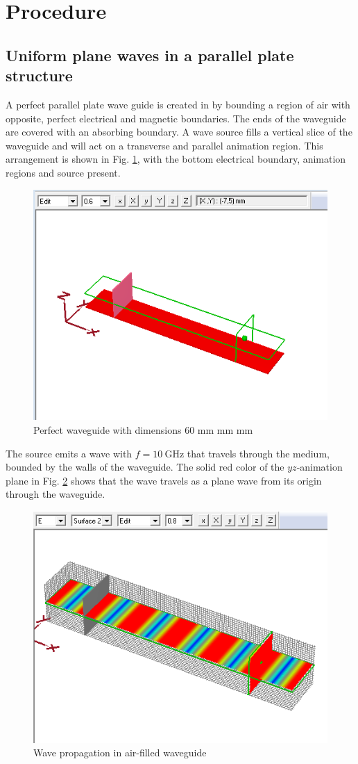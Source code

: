 \section{Procedure}\label{sec:procedure}
\subsection{Uniform plane waves in a parallel plate structure}
A perfect parallel plate wave guide is created in \mefisto by bounding a region of air with opposite, perfect electrical and magnetic boundaries.
The ends of the waveguide are covered with an absorbing boundary.
A wave source fills a vertical slice of the waveguide and will act on a transverse and parallel animation region.
This arrangement is shown in Fig. \ref{fig:waveguide}, with the bottom electrical boundary, animation regions and source present.

\begin{figure}[tbph]
	\centering
	\includegraphics[width=0.7\linewidth]{graphics/waveguide}
	\caption{Perfect waveguide with dimensions 60 mm  mm  mm}
	\label{fig:waveguide}
\end{figure}

The source emits a wave with $f = \SI{10}{\giga\hertz}$ that travels through the medium, bounded by the walls of the waveguide.
The solid red color of the $yz$-animation plane in Fig. \ref{fig:Task1-2dsurface} shows that the wave travels as a plane wave from its origin through the waveguide.

\begin{figure}[tbph]
	\centering
	\includegraphics[width=0.7\linewidth]{graphics/Task1-2dsurface}
	\caption{Wave propagation in air-filled waveguide}
	\label{fig:Task1-2dsurface}
\end{figure}

